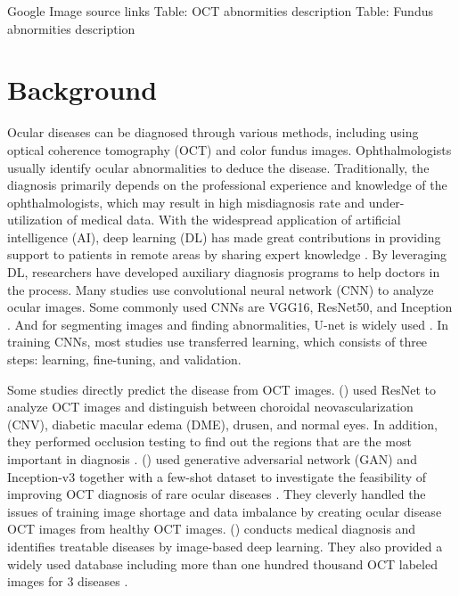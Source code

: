\documentclass{article}
\newcommand{\authyear}[1]{\citeauthor{#1} (\citeyear{#1})}
\begin{document}
		Google Image source links
		Table: OCT abnormities description
		Table: Fundus abnormities description
	
	
	
	
	
	
	\section{Background}
		
		Ocular diseases can be diagnosed through various methods, including using optical coherence tomography (OCT) and color fundus images. Ophthalmologists usually identify ocular abnormalities to deduce the disease.  Traditionally, the diagnosis primarily depends on the professional experience and knowledge of the ophthalmologists, which may result in high misdiagnosis rate and under-utilization of medical data.  With the widespread application of artificial intelligence (AI), deep learning (DL) has made great contributions in providing support to patients in remote areas by sharing expert knowledge \autocite{Ichhpujani_Thakur_2021}.  By leveraging DL, researchers have developed auxiliary diagnosis programs to help doctors in the process. Many studies use convolutional neural network (CNN) to analyze ocular images. Some commonly used CNNs are VGG16, ResNet50, and Inception \autocite{daich2023artificial}.  And for segmenting images and finding abnormalities, U-net is widely used \autocite{Ronneberger_Fischer_Brox_2015}. In training CNNs, most studies use transferred learning, which consists of three steps: learning, fine-tuning, and validation.
		
		Some studies directly predict the disease from OCT images.
		\authyear{li2019deep} used ResNet to analyze OCT images and distinguish between choroidal neovascularization (CNV), diabetic macular edema (DME), drusen, and normal eyes. In addition, they performed occlusion testing to find out the regions that are the most important in diagnosis \autocite{li2019deep}. 
		\authyear{yoo2021feasibility} used generative adversarial network (GAN) and Inception-v3 together with a few-shot dataset to investigate the feasibility of improving OCT diagnosis of rare ocular diseases \autocite{yoo2021feasibility}.  They cleverly handled the issues of training image shortage and data imbalance by creating ocular disease OCT images from healthy OCT images. \authyear{Kermany2018} conducts medical diagnosis and identifies treatable diseases by image-based deep learning.  They also provided a widely used database including more than one hundred thousand OCT labeled images for 3 diseases \autocite{Kermany2018}.
		
\end{document}

